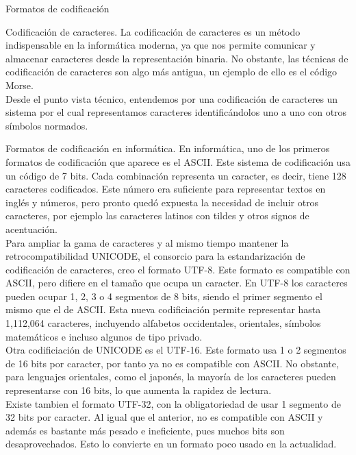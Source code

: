 	
	\begin{section}{Formatos de codificaci\'on}
		\begin{subsection}{Codificación de caracteres.}
			La codificación de caracteres es un método indispensable en la informática moderna, ya que nos permite comunicar y almacenar caracteres desde la representación binaria. No obstante, las técnicas de codificación de caracteres son algo más antigua, un ejemplo de ello es el código Morse. \\
			
			Desde el punto vista técnico, entendemos por una codificación de caracteres un sistema por el cual representamos caracteres identificándolos uno a uno con otros símbolos normados. 
		\end{subsection}
		
		\begin{subsection}{Formatos de codificación en informática.}
			En informática, uno de los primeros formatos de codificación que aparece es el ASCII. Este sistema de codificación usa un código de 7 bits. Cada combinación representa un caracter, es decir, tiene 128 caracteres codificados. Este número era suficiente para representar textos en inglés y números, pero pronto quedó expuesta la necesidad de incluir otros caracteres, por ejemplo las caracteres latinos con tildes y otros signos de acentuación. \\
			
			Para ampliar la gama de caracteres y al mismo tiempo mantener la retrocompatibilidad UNICODE\cite{unicode}, el consorcio para la estandarización de codificación de caracteres, creo el formato UTF-8. Este formato es compatible con ASCII, pero difiere en el tamaño que ocupa un caracter. En UTF-8 los caracteres pueden ocupar 1, 2, 3 o 4 segmentos de 8 bits, siendo el primer segmento el mismo que el de ASCII.  Esta nueva codificiación permite representar hasta 1,112,064 caracteres, incluyendo alfabetos occidentales, orientales, símbolos matemáticos e incluso algunos de tipo privado. \\
			
			Otra codificiación de UNICODE es el UTF-16. Este formato usa 1 o 2 segmentos de 16 bits por caracter, por tanto ya no es compatible con ASCII. No obstante, para lenguajes orientales, como el japonés, la mayoría de los caracteres pueden representarse con 16 bits, lo que aumenta la rapidez de lectura. \\ 
			
			Existe tambien el formato UTF-32, con la obligatoriedad de usar 1 segmento de 32 bits por caracter. Al igual que el anterior, no es compatible con ASCII y además es bastante más pesado e ineficiente, pues muchos bits son desaprovechados. Esto lo convierte en un formato poco usado en la actualidad.
		\end{subsection}
		

\end{section}
